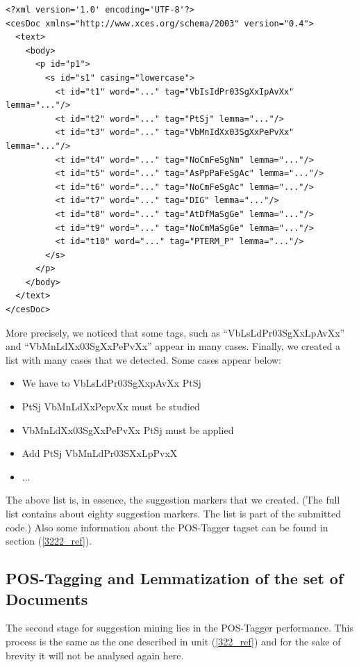 {}
\begin{lstlisting}[frame=single, basicstyle=\small]
<?xml version='1.0' encoding='UTF-8'?>
<cesDoc xmlns="http://www.xces.org/schema/2003" version="0.4">
  <text>
    <body>
      <p id="p1">
        <s id="s1" casing="lowercase">
          <t id="t1" word="..." tag="VbIsIdPr03SgXxIpAvXx" lemma="..."/>
          <t id="t2" word="..." tag="PtSj" lemma="..."/>
          <t id="t3" word="..." tag="VbMnIdXx03SgXxPePvXx" lemma="..."/>
          <t id="t4" word="..." tag="NoCmFeSgNm" lemma="..."/>
          <t id="t5" word="..." tag="AsPpPaFeSgAc" lemma="..."/>
          <t id="t6" word="..." tag="NoCmFeSgAc" lemma="..."/>
          <t id="t7" word="..." tag="DIG" lemma="..."/>
          <t id="t8" word="..." tag="AtDfMaSgGe" lemma="..."/>
          <t id="t9" word="..." tag="NoCmMaSgGe" lemma="..."/>
          <t id="t10" word="..." tag="PTERM_P" lemma="..."/>
        </s>
      </p>
    </body>
  </text>
</cesDoc>
\end{lstlisting}

More precisely, we noticed that some tags, such as ``VbLsLdPr03SgXxLpAvXx'' and ``VbMnLdXx03SgXxPePvXx'' appear in many cases. Finally, we created a list with many cases that we detected. Some cases appear below:\\

\begin{itemize}

	\item We have to VbLsLdPr03SgXxpAvXx PtSj
	\item PtSj VbMnLdXxPepvXx must be studied
	\item VbMnLdXx03SgXxPePvXx PtSj must be applied
	\item Add PtSj VbMnLdPr03SXxLpPvxX
	\item ...\\

\end{itemize}
The above list is, in essence, the suggestion markers that we created. (The full list contains about eighty suggestion markers. The list is part of the submitted code.) Also some information about the POS-Tagger tagset can be found in section (\ref{3222_ref}).

\subsection{POS-Tagging and Lemmatization of the set of Documents}\label{332_ref}
The second stage for suggestion mining lies in the POS-Tagger performance. This process is the same as the one described in unit (\ref{322_ref}) and for the sake of brevity it will not be analysed again here.

